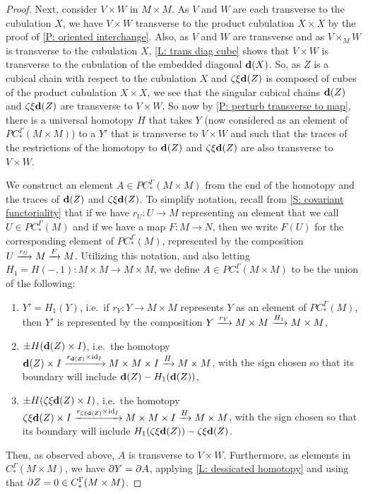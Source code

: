 \documentclass{amsart}
\begin{document}
\begin{proof}
Next, consider $V\times W$ in $M\times M$. As $V$ and $W$ are each transverse to the cubulation $X$, we have $V\times W$ transverse to the product cubulation $X\times X$ by the proof of \cref{P: oriented interchange}. 
Also, as $V$ and $W$ are transverse and as $V\times_MW$ is transverse to the cubulation $X$, \cref{L: trans diag cube} shows that $V\times W$ is transverse to the cubulation of the embedded diagonal  $\mathbf{d}(X)$. So, as $Z$ is a cubical chain with respect to the cubulation $X$ and $\zeta\xi\mathbf{d}(Z)$ is composed of cubes of the product cubulation $X\times X$, we see that the singular cubical chains $\mathbf{d}(Z)$ and  $\zeta\xi\mathbf{d}(Z)$ are transverse to $V\times W$. So now by \cref{P: perturb transverse to map}, there is a universal homotopy $H$ that takes $Y$ (now considered as an element of $PC^\Gamma_*(M\times M)$) to a $Y'$ that is transverse to $V\times W$ and such that the traces of the restrictions of the homotopy to $\mathbf{d}(Z)$ and  $\zeta\xi\mathbf{d}(Z)$
are also transverse to  $V\times W$. 

We construct an element $A\in PC^\Gamma_*(M\times M)$ from the end of the homotopy and the traces of $\mathbf{d}(Z)$ and $\zeta\xi\mathbf{d}(Z)$. To simplify notation, recall from \cref{S: covariant functoriality} that if we have $r_U:U\to M$ representing an element that we call $U\in PC^\Gamma_*(M)$ and if we have a map $F:M\to N$, then we write $F(U)$ for the corresponding element of $PC^\Gamma_*(M)$, represented by the composition $U\xrightarrow{r_U}M\xrightarrow{F}M$.
Utilizing this notation, and also letting $H_1=H(-,1):M\times M\to M\times M$, we define $A\in PC^\Gamma_*(M\times M)$ to be the union of the following:
\begin{enumerate}
\item $Y'=H_1(Y)$, i.e.\ if $r_Y:Y\to M\times M$ represents $Y$ as an element of $PC^\Gamma_*(M)$, then $Y'$ is represented by  the composition $Y\xrightarrow{r_Y} M\times M\xrightarrow{H_1}M\times M$, 

\item $\pm H(\mathbf{d}(Z)\times I)$, i.e.\ the homotopy $\mathbf{d}(Z)\times I\xrightarrow{r_{\mathbf{d}(Z)}\times \mathrm{id}_I} M\times M\times I\xrightarrow{H}M\times M$, with the sign chosen so that its boundary will include $\mathbf{d}(Z)-H_1(\mathbf{d}(Z))$,

\item $\pm H(\zeta\xi\mathbf{d}(Z)\times I)$, i.e.\ the homotopy $\zeta\xi\mathbf{d}(Z)\times I\xrightarrow{r_{\zeta\xi\mathbf{d}(Z)}\times \mathrm{id}_I} M\times M\times I\xrightarrow{H}M\times M$, with the sign chosen so that its boundary will include $H_1(\zeta\xi\mathbf{d}(Z))-\zeta\xi\mathbf{d}(Z)$.
\end{enumerate}
Then, as observed above, $A$ is transverse to $V\times W$. Furthermore, as elements in $C_*^\Gamma(M\times M)$, we have $\partial Y=\partial A$, applying \cref{L: dessicated homotopy} and using that $\partial Z=0\in C_*^\Gamma(M\times M)$.




\end{proof}
\end{document}
